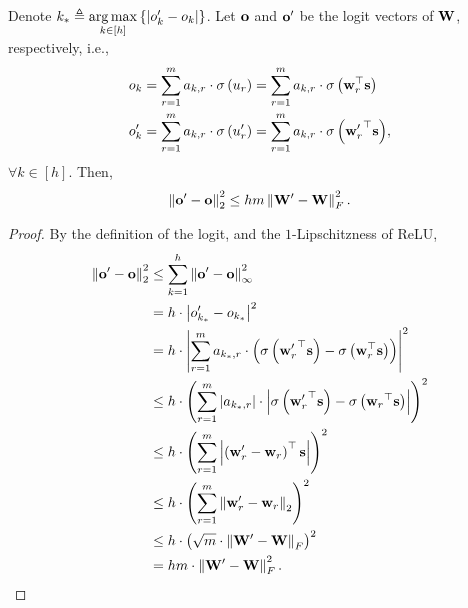 \begin{lem}
\label{lem:logit_upper_bound_parameter}
Denote $k_* \triangleq \operatorname*{arg\,max}\limits_{k \in [h]}\left\{ \left| o_{k}^\prime - o_{k} \right| \right\}$. Let ${\mathbf{o}}$ and ${\mathbf{o}}^\prime$ be the logit vectors of ${\mathbf{W}}$, respectively, i.e.,
\begin{equation*}
\begin{split}
    &o_{k} = \sum\limits_{r=1}^{m}{ a_{k,r} \cdot \sigma\left( u_{r} \right)} = \sum\limits_{r=1}^{m}{ a_{k,r} \cdot \sigma\left({\mathbf{w}}_r^\top {\mathbf{s}} \right)} \\
    &o_{k}^\prime = \sum\limits_{r=1}^{m}{ a_{k,r} \cdot \sigma\left( u_{r}^\prime \right)} = \sum\limits_{r=1}^{m}{ a_{k,r} \cdot \sigma\left({{\mathbf{w}}_r^\prime}^\top {\mathbf{s}} \right)},
\end{split}
\end{equation*}
$\forall k \in [h]$. Then,
\begin{equation*}
\begin{split}
    \left\| {\mathbf{o}}^\prime - {\mathbf{o}} \right\|_2^2 \le h m \left\| {\mathbf{W}}^\prime - {\mathbf{W}} \right\|_F^2.
\end{split}
\end{equation*}
\end{lem}
\begin{proof}
By the definition of the logit, and the $1$-Lipschitzness of ReLU,
\begin{equation*}
\begin{split}
    \left\| {\mathbf{o}}^\prime - {\mathbf{o}} \right\|_2^2 &\le \sum\limits_{k = 1}^{h}{ \left\| {\mathbf{o}}^\prime - {\mathbf{o}} \right\|_\infty^2} \\
    &= h \cdot \left| o_{k_*}^\prime - o_{k_*} \right|^2 \\
    &= h \cdot \left| \sum\limits_{r=1}^{m}{ a_{k_*,r} \cdot \left( \sigma\left({{\mathbf{w}}_r^\prime}^\top {\mathbf{s}} \right) - \sigma\left({\mathbf{w}}_r^\top {\mathbf{s}} \right) \right)} \right|^2 \\
    &\le h \cdot \left( \sum\limits_{r=1}^{m}{ \left| a_{k_*,r} \right| \cdot \left| \sigma\left({{\mathbf{w}}_r^\prime}^\top {\mathbf{s}}\right) - \sigma\left({{\mathbf{w}}_r}^\top {\mathbf{s}}\right) \right|  } \right)^2 \\
    &\le h \cdot \left( \sum\limits_{r=1}^{m}{ \left| \left({{\mathbf{w}}_r^\prime} - {\mathbf{w}}_r \right)^\top {\mathbf{s}}\right|  } \right)^2 \\
    &\le h \cdot \left( \sum\limits_{r=1}^{m}{ \left\| {{\mathbf{w}}_r^\prime} - {\mathbf{w}}_r \right\|_2  } \right)^2 \\
    &\le h \cdot \left( \sqrt{m} \cdot \left\| {\mathbf{W}}^\prime - {\mathbf{W}} \right\|_F \right)^2 \\
    &= h m \cdot \left\| {\mathbf{W}}^\prime - {\mathbf{W}} \right\|_F^2. \qedhere
\end{split}
\end{equation*}
\end{proof}

